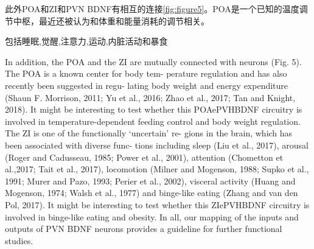 此外POA和ZI和PVN BDNF有相互的连接\figurename{\ref{fig:figure5}}。POA是一个已知的温度调节中枢，最近还被认为和体重和能量消耗的调节相关\citep{morrison2011central,yu2016glutamatergic,zhao2017hypothalamic,tan2018regulation}。

包括睡眠\citep{liu2017lhx6},觉醒\citep{roger1985afferents,power2001evidence},注意力\citep{chometton2017rostromedial,tait2017effects},运动\citep{milner1988electrical,supko1991activation,murer1993circling,perier2002behavioral},内脏活动\citep{huang1974differential,walsh1977some}和暴食\citep{zhang2017rapid}


In addition, the POA and the ZI are mutually connected with  neurons (Fig. 5). The POA is a known center for body tem- perature regulation and has also recently been suggested in regu- lating body weight and energy expenditure (Shaun F. Morrison, 2011; Yu et al., 2016; Zhao et al., 2017; Tan and Knight, 2018). It might be interesting to test whether this POAePVHBDNF circuitry is involved in temperature-dependent feeding control and body weight regulation. The ZI is one of the functionally ‘uncertain’ re- gions in the brain, which has been associated with diverse func- tions including sleep (Liu et al., 2017), arousal (Roger and Cadusseau, 1985; Power et al., 2001), attention (Chometton et al.,2017; Tait et al., 2017), locomotion (Milner and Mogenson, 1988; Supko et al., 1991; Murer and Pazo, 1993; Perier et al., 2002), visceral activity (Huang and Mogenson, 1974; Walsh et al., 1977) and binge-like eating (Zhang and van den Pol, 2017). It might be interesting to test whether this ZIePVHBDNF circuitry is involved in binge-like eating and obesity. In all, our mapping of the inputs and outputs of PVN BDNF neurons provides a guideline for further functional studies.


